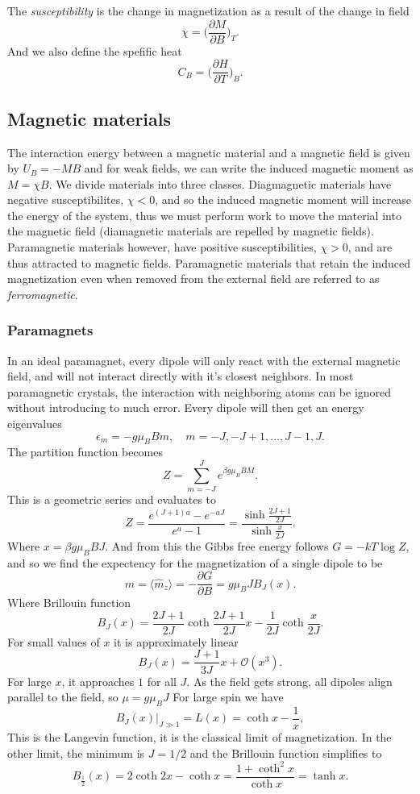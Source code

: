 \documentclass[a4paper, 11pt, notitlepage, english]{article}
\newcommand{\op}[1]{\hat{#1}}
\newcommand{\eps}{\epsilon}
\newcommand{\p}{\partial}
\begin{document}
The \emph{susceptibility} is the change in magnetization as a result of the change in field
$$\chi = \bigg(\frac{\p M}{\p B}\bigg)_T.$$
And we also define the spefific heat
$$C_B = \bigg(\frac{\p H}{\p T}\bigg)_B.$$

\subsection*{Magnetic materials}

The interaction energy between a magnetic material and a magnetic field is given by $U_B = -MB$ and for weak fields, we can write the induced magnetic moment as $M = \chi B$. We divide materials into three classes. Diagmagnetic materials have negative susceptibilites, $\chi < 0$, and so the induced magnetic moment will increase the energy of the system, thus we must perform work to move the material into the magnetic field (diamagnetic materials are repelled by magnetic fields). Paramagnetic materials however, have positive susceptibilities, $\chi > 0$, and are thus attracted to magnetic fields. Paramagnetic materials that retain the induced magnetization even when removed from the external field are referred to as \emph{ferromagnetic}.

\subsubsection*{Paramagnets}

In an ideal paramagnet, every dipole will only react with the external magnetic field, and will not interact directly with it's closest neighbors. In most paramagnetic crystals, the interaction with neighboring atoms can be ignored without introducing to much error. Every dipole will then get an energy eigenvalues
$$\eps_m = -g\mu_B B m, \quad m=-J, -J+1, \ldots, J-1, J.$$
The partition function becomes
$$Z = \sum_{m=-J}^J e^{\beta g\mu_B B M}.$$
This is a geometric series and evaluates to
$$Z = \frac{e^{(J+1)a} - e^{-aJ}}{e^a - 1} = \frac{\sinh \frac{2J+1}{2J}}{\sinh \frac{x}{2J}}.$$
Where $x = \beta g \mu_B B J$. And from this the Gibbs free energy follows $G = -kT \log Z$, and so we find the expectency for the magnetization of a single dipole to be
$$m = \langle \op{m}_z \rangle = -\frac{\p G}{\p B} = g\mu_B J B_J(x).$$
Where Brillouin function
$$B_J(x) = \frac{2J+1}{2J}\coth \frac{2J+1}{2J} x - \frac{1}{2J}\coth \frac{x}{2J}.$$
For small values of $x$ it is approximately linear
$$B_J(x) = \frac{J+1}{3J}x + \mathcal{O}(x^3).$$
For large $x$, it approaches $1$ for all $J$. As the field gets strong, all dipoles align parallel to the field, so $\mu = g\mu_B J$
For large spin we have
$$B_J(x)\big|_{J\gg1} = L(x) = \coth x - \frac{1}{x},$$
This is the Langevin function, it is the classical limit of magnetization.
In the other limit, the minimum is $J=1/2$ and the Brillouin function simplifies to
$$B_{\frac{1}{2}}(x) = 2\coth 2x - \coth x = \frac{1 + \coth^2 x}{\coth x} = \tanh x.$$
\end{document}
